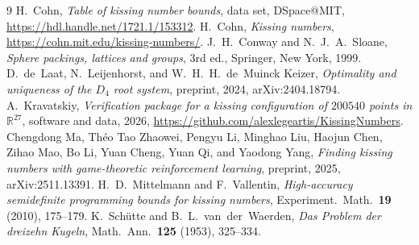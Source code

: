 \documentclass[11pt]{amsart}
\theoremstyle{remark}
\begin{document}
\begin{thebibliography}{9}
 H.~Cohn, \emph{Table of kissing number bounds}, data set,
DSpace@MIT, \url{https://hdl.handle.net/1721.1/153312}.
 H.~Cohn, \emph{Kissing numbers},
\url{https://cohn.mit.edu/kissing-numbers/}.
 J.~H.~Conway and N.~J.~A.~Sloane, \emph{Sphere packings, lattices
and groups}, 3rd ed., Springer, New York, 1999.
 D.~de~Laat, N.~Leijenhorst, and W.~H.~H.~de~Muinck Keizer,
\emph{Optimality and uniqueness of the $D_4$ root system}, preprint, 2024,
arXiv:2404.18794.
 A.~Kravatskiy, \emph{Verification package for a kissing
configuration of $200540$ points in $\mathbb{R}^{27}$}, software and data, 2026,
\url{https://github.com/alexlegeartis/KissingNumbers}.
 Chengdong Ma, Th\'{e}o Tao Zhaowei, Pengyu Li, Minghao Liu,
Haojun Chen, Zihao Mao, Bo Li, Yuan Cheng, Yuan Qi, and Yaodong Yang,
\emph{Finding kissing numbers with game-theoretic reinforcement learning},
preprint, 2025, arXiv:2511.13391.
 H.~D.~Mittelmann and F.~Vallentin, \emph{High-accuracy
semidefinite programming bounds for kissing numbers}, Experiment.\ Math.\
\textbf{19} (2010), 175--179.
 K.~Sch\"{u}tte and B.~L.~van~der~Waerden, \emph{Das Problem der
dreizehn Kugeln}, Math.\ Ann.\ \textbf{125} (1953), 325--334.
\end{thebibliography}
\end{document}
